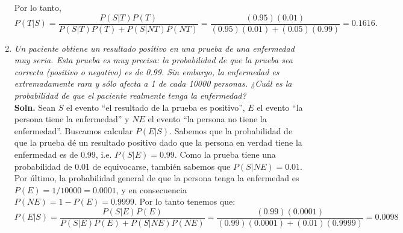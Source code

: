 \documentclass[letterpaper,11pt]{article}
\begin{document}
\begin{enumerate}
    Por lo tanto, 
    \[P(T|S)=\frac{P(S|T)P(T)}{P(S|T)P(T)+P(S|NT)P(NT)} = \frac{(0.95)(0.01)}{(0.95)(0.01)+(0.05)(0.99)}=
    0.1616.\]
\item \emph{Un paciente obtiene un resultado positivo en una prueba de una enfermedad muy seria. Esta
prueba es muy precisa: la probabilidad de que la prueba sea correcta (positivo o negativo) es
de 0.99. Sin embargo, la enfermedad es extremadamente rara y sólo afecta a 1 de cada 10000
personas. ¿Cuál es la probabilidad de que el paciente realmente tenga la enfermedad?}\\
    {\bf Soln.} Sean $S$ el evento ``el resultado de la prueba es positivo'', $E$ el evento ``la persona tiene la
    enfermedad'' y $NE$ el evento ``la persona no tiene la enfermedad''. Buscamos calcular $P(E|S)$. Sabemos que
    la probabilidad de que la prueba dé un resultado positivo dado que la persona en verdad tiene la
    enfermedad es de 0.99, i.e. 
    $P(S|E)=0.99$. Como la prueba tiene una probabilidad de 0.01 de equivocarse, también sabemos que
    $P(S|NE)=0.01$. Por último, la probabilidad general de que la persona tenga la enfermedad es
    $P(E)=1/10000=0.0001$, y en consecuencia $P(NE)=1-P(E)=0.9999$.  Por lo tanto tenemos que: 
    \[P(E|S)=\frac{P(S|E)P(E)}{P(S|E)P(E)+P(S|NE)P(NE)} = \frac{(0.99)(0.0001)}{(0.99)(0.0001)+(0.01)
    (0.9999)}=0.0098\]


\end{enumerate}
\end{document}
